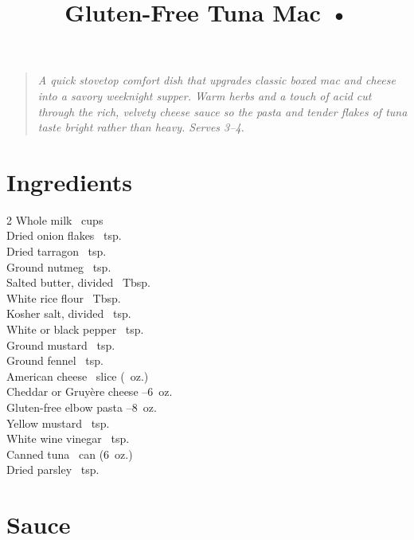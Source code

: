 \documentclass[11pt,letterpaper]{article}
\title{Gluten-Free Tuna Mac •}
\author{}
\date{}
\begin{document}
\maketitle
\thispagestyle{empty}

\begin{quote}\textit{A quick stovetop comfort dish that upgrades classic boxed mac and cheese into a savory weeknight supper. Warm herbs and a touch of acid cut through the rich, velvety cheese sauce so the pasta and tender flakes of tuna taste bright rather than heavy. Serves 3--4.}\end{quote}

\section*{Ingredients}
\setlength{\columnsep}{20pt}
\begin{multicols}{2}
\noindent
    Whole milk ~cups \\
    Dried onion flakes ~tsp. \\
    Dried tarragon \dotfill {}~tsp. \\
    Ground nutmeg \dotfill {}~tsp. \\
    Salted butter, divided ~Tbsp. \\
    White rice flour ~Tbsp. \\
    Kosher salt, divided ~tsp. \\
    White or black pepper \dotfill {}~tsp. \\
    Ground mustard \dotfill {}~tsp. \\

    \columnbreak
    \noindent
    Ground fennel \dotfill {}~tsp. \\
    American cheese ~slice (~oz.) \\
    Cheddar or Gruyère cheese --6~oz. \\
    Gluten-free elbow pasta --8~oz. \\
    Yellow mustard ~tsp. \\
    White wine vinegar ~tsp. \\
    Canned tuna ~can (6~oz.) \\
    Dried parsley ~tsp. \\
\end{multicols}

\section*{Sauce}
\end{document}
